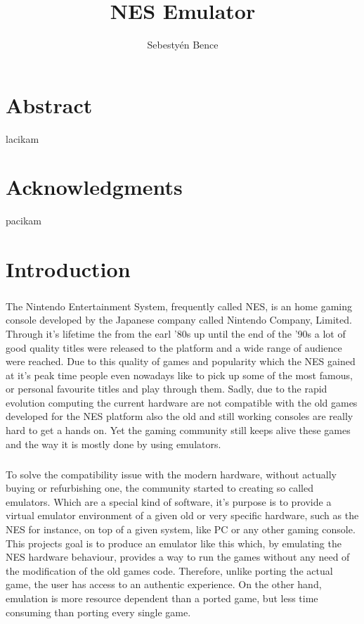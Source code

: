 \documentclass[]{report}
\title{NES Emulator}
\author{Sebestyén Bence}
\begin{document}
	
\chapter*{Abstract}
lacikam
\pagebreak

\chapter*{Acknowledgments}
pacikam
\pagebreak


\tableofcontents

\clearpage

\chapter{Introduction}

\paragraph{}
The Nintendo Entertainment System, frequently called NES, is an home gaming console developed by the Japanese company called Nintendo Company, Limited.  Through it's lifetime the from the earl '80s up until the end of the '90s a lot of good quality titles were released to the platform and a wide range of audience were reached. Due to this quality of games and  popularity which the NES gained at it's peak time people even nowadays like to pick up some of the most famous, or personal favourite titles and play through them. Sadly, due to the rapid evolution computing the current hardware are not compatible with the old games developed for the NES platform also the old and still working consoles are really hard to get a hands on. Yet the gaming community still keeps alive these games and the way it is mostly done by using emulators.

\paragraph{ }
To solve the compatibility issue with the modern hardware, without actually buying or refurbishing one, the community started to creating so called emulators. Which are a special kind of software, it's purpose is to provide a virtual emulator environment of a given old or very specific hardware, such as the NES for instance, on top of a given system, like PC or any other gaming console. This projects goal is to produce an emulator like this which, by emulating the NES hardware behaviour, provides a way to run the games without any need of the modification of the old games code. Therefore, unlike porting the actual game, the user has access to an authentic experience. On the other hand, emulation is more resource dependent than a ported game, but less time consuming than porting every single game.
\end{document}
